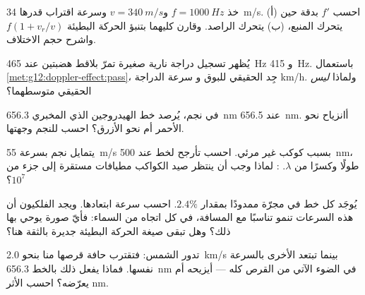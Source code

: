 \begin{exercise}[$\star\star$]\label{exo:g12:doppler-effect:9}
خذ $f = \qty{1000}{Hz}$ و$v = \qty{340}{m/s}$ وسرعة اقتراب قدرها \qty{34}{m/s}.
احسب $f'$ بدقة حين (أ) يتحرك المنبع، (ب) يتحرك الراصد. وقارن كليهما
بتنبؤ الحركة البطيئة $f(1 + v_r/v)$ واشرح حجم الاختلاف.
\end{exercise}

\begin{exercise}[$\star\star$]\label{exo:g12:doppler-effect:10}
يُظهر تسجيل دراجة نارية صغيرة تمرّ بلاقط هضبتين عند \qty{465}{Hz} و
\qty{415}{Hz}. باستعمال \cref{met:g12:doppler-effect:pass}، جِد  الحقيقي للبوق و
سرعة الدراجة  \unit{km/h}. ولماذا \emph{ليس}  الحقيقي متوسطهما؟
\end{exercise}

\begin{exercise}[$\star\star$]\label{exo:g12:doppler-effect:11}
في  نجم، يُرصد خط الهيدروجين الذي  المخبري \qty{656.3}{nm}
عند \qty{656.5}{nm}. أانزياح نحو الأحمر أم نحو الأزرق؟ احسب  للنجم وجهتها.
\end{exercise}

\begin{exercise}[$\star\star\star$]\label{exo:g12:doppler-effect:12}
يتمايل نجم بسرعة \qty{55}{m/s} بسبب كوكب غير مرئي. احسب 
تأرجح  لخط عند \qty{500}{nm}، طولًا وكسرًا من $\lambda$. : لماذا وجب أن ينتظر صيد الكواكب مطيافات مستقرة إلى جزء من
$10^{7}$؟
\end{exercise}

\begin{exercise}[$\star\star\star$]\label{exo:g12:doppler-effect:13}
يُوجَد كل خط في  مجرّة ممدودًا بمقدار $2.4\%$. احسب سرعة ابتعادها.
ويجد الفلكيون أن هذه السرعات تنمو تناسبًا مع المسافة، في كل اتجاه من
السماء: فأيّ صورة يوحي بها ذلك؟ وهل تبقى صيغة الحركة البطيئة جديرة بالثقة هنا؟
\end{exercise}

\begin{exercise}[$\star\star\star$]\label{exo:g12:doppler-effect:14}
تدور الشمس: فتقترب حافة قرصها منا بنحو \qty{2.0}{km/s} بينما تبتعد
الأخرى بالسرعة نفسها. فماذا يفعل ذلك بالخط \qty{656.3}{nm} في الضوء الآتي من القرص
كله --- أيزيحه أم يعرّضه؟ احسب الأثر  \unit{nm}.
\end{exercise}

